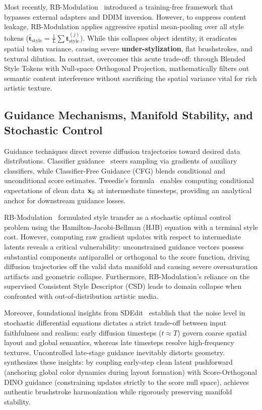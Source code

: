 Most recently, RB-Modulation~\cite{rout2025rbmodulation} introduced a training-free framework that bypasses external adapters and DDIM inversion. However, to suppress content leakage, RB-Modulation applies aggressive spatial mean-pooling over all style tokens ($\bar{\mathbf{t}}_{\text{style}} = \frac{1}{L} \sum \mathbf{t}_{\text{style}}^{(j)}$). While this collapses object identity, it eradicates spatial token variance, causing severe \textbf{under-stylization}, flat brushstrokes, and textural dilution. In contrast, \method overcomes this acute trade-off: through Blended Style Tokens with Null-space Orthogonal Projection, \method mathematically filters out semantic content interference without sacrificing the spatial variance vital for rich artistic texture.

\subsection{Guidance Mechanisms, Manifold Stability, and Stochastic Control}
Guidance techniques direct reverse diffusion trajectories toward desired data distributions. Classifier guidance~\cite{dhariwal2021diffusion} steers sampling via gradients of auxiliary classifiers, while Classifier-Free Guidance (CFG) blends conditional and unconditional score estimates. Tweedie's formula~\cite{tweedie} enables computing conditional expectations of clean data $\mathbf{x}_0$ at intermediate timesteps, providing an analytical anchor for downstream guidance losses. 

RB-Modulation~\cite{rout2025rbmodulation} formulated style transfer as a stochastic optimal control problem using the Hamilton-Jacobi-Bellman (HJB) equation with a terminal style cost. However, computing raw gradient updates with respect to intermediate latents reveals a critical vulnerability: unconstrained guidance vectors possess substantial components antiparallel or orthogonal to the score function, driving diffusion trajectories off the valid data manifold and causing severe oversaturation artifacts and geometric collapse. Furthermore, RB-Modulation's reliance on the supervised Consistent Style Descriptor (CSD) leads to domain collapse when confronted with out-of-distribution artistic media. 

Moreover, foundational insights from SDEdit~\cite{sdedit} establish that the noise level in stochastic differential equations dictates a strict trade-off between input faithfulness and realism: early diffusion timesteps ($t \approx T$) govern coarse spatial layout and global semantics, whereas late timesteps resolve high-frequency textures. Uncontrolled late-stage guidance inevitably distorts geometry. \method synthesizes these insights: by coupling early-step clean latent pushforward (anchoring global color dynamics during layout formation) with Score-Orthogonal DINO guidance (constraining updates strictly to the score null space), \method achieves authentic brushstroke harmonization while rigorously preserving manifold stability.
